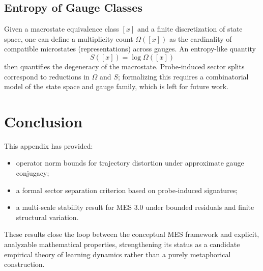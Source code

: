 \documentclass[11pt]{article}
\begin{document}
\subsection{Entropy of Gauge Classes}

Given a macrostate equivalence class $[x]$ and a finite discretization of state space, one can define a multiplicity count $\Omega([x])$ as the cardinality of compatible microstates (representations) across gauges. An entropy-like quantity
\[
  S([x]) = \log \Omega([x])
\]
then quantifies the degeneracy of the macrostate. Probe-induced sector splits correspond to reductions in $\Omega$ and $S$; formalizing this requires a combinatorial model of the state space and gauge family, which is left for future work.

\section*{Conclusion}

This appendix has provided:
\begin{itemize}
  \item operator norm bounds for trajectory distortion under approximate gauge conjugacy;
  \item a formal sector separation criterion based on probe-induced signatures;
  \item a multi-scale stability result for MES 3.0 under bounded residuals and finite structural variation.
\end{itemize}
These results close the loop between the conceptual MES framework and explicit, analyzable mathematical properties, strengthening its status as a candidate empirical theory of learning dynamics rather than a purely metaphorical construction.


\nocite{*}


\end{document}
